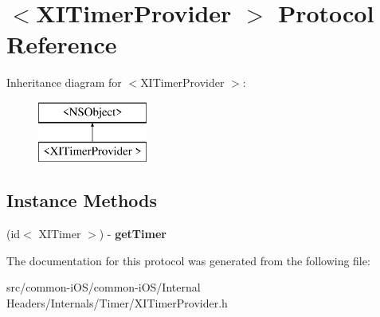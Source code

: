 \hypertarget{protocol_x_i_timer_provider_01-p}{}\section{$<$X\+I\+Timer\+Provider $>$ Protocol Reference}
\label{protocol_x_i_timer_provider_01-p}
Inheritance diagram for $<$X\+I\+Timer\+Provider $>$\+:\begin{figure}[H]
\begin{center}
\leavevmode
\includegraphics[height=2.000000cm]{protocol_x_i_timer_provider_01-p}
\end{center}
\end{figure}
\subsection*{Instance Methods}
\begin{DoxyCompactItemize}
\item 
\hypertarget{protocol_x_i_timer_provider_01-p_aa1d2577a29a867cbe5f18c47ac81a4c5}{}\label{protocol_x_i_timer_provider_01-p_aa1d2577a29a867cbe5f18c47ac81a4c5} 
(id$<$ X\+I\+Timer $>$) -\/ {\bfseries get\+Timer}
\end{DoxyCompactItemize}


The documentation for this protocol was generated from the following file\+:\begin{DoxyCompactItemize}
\item 
src/common-\/i\+O\+S/common-\/i\+O\+S/\+Internal Headers/\+Internals/\+Timer/X\+I\+Timer\+Provider.\+h\end{DoxyCompactItemize}

